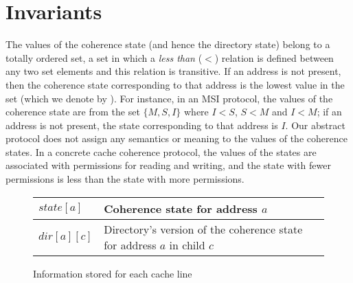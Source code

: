 \section{Invariants}
\label{sec:invariants}

\newcommand{\threeAngle}[4]{\text{$#1\langle#2,#3,#4\rangle$}}

\newcommand{\Req}[3]{\threeAngle{Req}{#1}{#2}{#3}}
\newcommand{\Resp}[3]{\threeAngle{Resp}{#1}{#2}{#3}}
\newcommand{\Inv}{\text{$Inv$}{}}
\newcommand{\Dirty}{\text{$Dirty$}{}}
\newcommand{\True}{\text{$True$}{}}
\newcommand{\False}{\text{$False$}{}}

The values of the coherence state (and hence the directory state) belong to a
totally ordered set, \ie a set in which a \emph{less than} ($<$) relation is
defined between any two set elements and this relation is transitive. If an
address is not present, then the coherence state corresponding to that address
is the lowest value in the set (which we denote by \Inv). For instance, in an
MSI protocol, the values of the coherence state are from the set $\{M, S, I\}$
where $I < S$, $S < M$ and $I < M$; if an address is not present, the state
corresponding to that address is $I$. Our abstract protocol does not assign any
semantics or meaning to the values of the coherence states. In a concrete cache
coherence protocol, the values of the states are associated with permissions
for reading and writing, and the state with fewer permissions is less than the
state with more permissions.

\begin{figure}\centering
\begin{tabularx}{\linewidth}{|l|X|}
\hline
$state[a]$ & Coherence state for address $a$\\
\hline
$dir[a][c]$ & Directory's version of the coherence state for address $a$ in child
$c$\\
\hline
\end{tabularx}
\caption{Information stored for each cache line}
\label{table:storage}
\end{figure}

